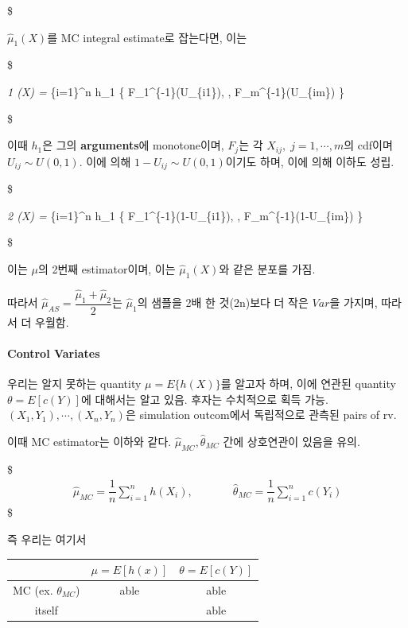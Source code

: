 \documentclass[
]{book}
\begin{document}
\$

\(\hat \mu_1 (X)\)를 MC integral estimate로 잡는다면, 이는

\$

\hat \mu\emph{1 (X) =  \sum}\{i=1\}\^{}n h\_1 \left\{ F\_1\^{}\{-1\}(U\_\{i1\}), \cdots, F\_m\^{}\{-1\}(U\_\{im\}) \right\}

\$

이때 \(h_1\)은 그의 \textbf{arguments}에 monotone이며, \(F_j\)는 각 \(X_{ij}, \; j=1,\cdots,m\)의 cdf이며 \(U_{ij} \sim U(0,1)\). 이에 의해 \(1-U_{ij} \sim U(0,1)\)이기도 하며, 이에 의해 이하도 성립.

\$

\hat \mu\emph{2 (X) =  \sum}\{i=1\}\^{}n h\_1 \left\{ F\_1\^{}\{-1\}(1-U\_\{i1\}), \cdots, F\_m\^{}\{-1\}(1-U\_\{im\}) \right\}

\$

이는 \(\mu\)의 2번째 estimator이며, 이는 \(\hat \mu_1 (X)\)와 같은 분포를 가짐.

따라서 \(\hat \mu_{AS} = \dfrac{\hat \mu_1 + \hat \mu_2}{2}\)는 \(\hat \mu_1\)의 샘플을 2배 한 것(2n)보다 더 작은 \(Var\)을 가지며, 따라서 더 우월함.

\hypertarget{control-variates}{%
\paragraph{Control Variates}\label{control-variates}}

우리는 알지 못하는 quantity \(\mu = E \{ h(X) \}\)를 알고자 하며, 이에 연관된 quantity \(\theta = E[c(Y)]\)에 대해서는 알고 있음. 후자는 수치적으로 획득 가능. \((X_1 , Y_1 ) ,\cdots, (X_n , Y_n )\)은 simulation outcom에서 독립적으로 관측된 pairs of rv.

이때 MC estimator는 이하와 같다. \(\hat \mu_{MC}, \hat \theta_{MC}\) 간에 상호연관이 있음을 유의.

\$
\begin{align*}

\hat \mu_{MC} = \dfrac {1}{n} \sum_{i=1}^n h(X_i), & \; \; \; \; \; \; \; \; \; \; \hat \theta_{MC} = \dfrac {1}{n} \sum_{i=1}^n c(Y_i)

\end{align*}
\$

즉 우리는 여기서

\begin{longtable}[]{@{}ccc@{}}
\toprule
& \(\mu = E[h(x)]\) & \(\theta = E[c(Y)]\) \\
\midrule
\endhead
MC (ex. \(\theta_{MC}\)) & able & able \\
itself & & able \\
\bottomrule
\end{longtable}
\end{document}
